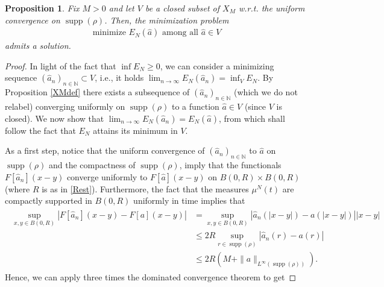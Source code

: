 \documentclass[A4paper,11pt]{article}
\newtheorem{proposition}[theorem]{Proposition}
\theoremstyle{definition}
\newcommand{\N}{\mathbb{N}}
\newcommand{\R}{\mathbb{R}}
\newcommand{\cl}{\mathcal{L}}
\DeclareMathOperator{\supp}{supp}
\begin{document}
\begin{proposition}\label{ENmin}
Fix $M > 0$ and let $V$ be a closed subset of $X_M$ w.r.t. the uniform convergence on $\supp(\rho)$. Then, the minimization problem
\begin{align*}
	\text{minimize } E_N(\widehat a) \text{ among all } \widehat a \in V
\end{align*}
admits a solution.
\end{proposition}
\begin{proof}
In light of the fact that $\inf E_N \geq 0$, we can consider a minimizing sequence $(\widehat a_n)_{n \in \N} \subset V$, i.e., it holds $\lim_{n \rightarrow \infty} E_N(\widehat a_n) = \inf_{V} E_N$. By Proposition \ref{XMdef} there exists a subsequence of $(\widehat a_n)_{n \in \N}$ (which we do not relabel) converging uniformly on $\supp(\rho)$ to a function $\widehat a \in V$ (since $V$ is closed). We now show that $\lim_{n \rightarrow \infty}E_N(\widehat a_n) = E_N(\widehat a)$, from which shall follow the fact that $E_N$ attains its minimum in $V$. 

As a first step, notice that the uniform convergence of $(\widehat a_n)_{n \in \N}$ to $\widehat a$ on $\supp(\rho)$ and the compactness of $\supp(\rho)$, imply that the functionals $F[\widehat a_n](x-y)$ converge uniformly to $F[\widehat a](x-y)$ on $B(0,R)\times B(0,R)$ (where $R$ is as in \eqref{Rest}). Furthermore, the fact that the measures $\mu^N(t)$ are compactly supported in $B(0,R)$ uniformly in time implies that
\begin{align}
\begin{split}\label{Faest}
\sup_{x,y\in B(0,R)}|F[\widehat a_n](x-y) - F[a](x-y)| &= \sup_{x,y\in B(0,R)}|\widehat a_n(|x-y|) - a(|x-y|)| |x-y| \\
&\leq 2R \sup_{r\in \supp(\rho)} |\widehat a_n(r) - a(r)| \\
& \leq 2R(M + \|a\|_{L^{\infty}(\supp(\rho))}).
\end{split}
\end{align}
Hence, we can apply three times the dominated convergence theorem to get


\end{proof}
\end{document}

